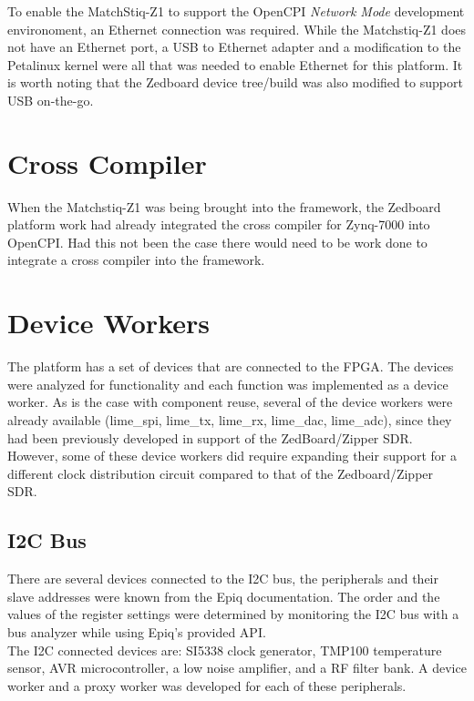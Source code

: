 \noindent To enable the MatchStiq-Z1 to support the OpenCPI \textit{Network Mode} development environoment, an Ethernet connection was required.  While the Matchstiq-Z1 does not have an Ethernet port,  a USB to Ethernet adapter and a modification to the Petalinux kernel were all that was needed to enable Ethernet for this platform. It is worth noting that the Zedboard device tree/build was also modified to support USB on-the-go.

\section{Cross Compiler}

When the Matchstiq-Z1 was being brought into the framework, the Zedboard platform work had already integrated the cross compiler for Zynq-7000 into OpenCPI.  Had this not been the case there would need to be work done to integrate a cross compiler into the framework.

\section{Device Workers}
The platform has a set of devices that are connected to the FPGA.  The devices were analyzed for functionality and each function was implemented as a device worker. As is the case with component reuse, several of the device workers were already available (lime\_spi, lime\_tx, lime\_rx, lime\_dac, lime\_adc), since they had been previously developed in support of the ZedBoard/Zipper SDR. However, some of these device workers did require expanding their support for a different clock distribution circuit compared to that of the Zedboard/Zipper SDR.

  \subsection{I2C Bus}
  There are several devices connected to the I2C bus, the peripherals and their slave addresses were known from the Epiq documentation.  The order and the values of the register settings were determined by monitoring the I2C bus with a bus analyzer while using Epiq's provided API.\\

\noindent The I2C connected devices are: SI5338 clock generator, TMP100 temperature sensor, AVR microcontroller, a low noise amplifier, and a RF filter bank.  A device worker and a  proxy worker was developed for each of these peripherals.

